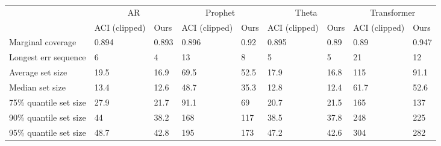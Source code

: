 \begin{tabular}{lllllllll}
\toprule
& \multicolumn{2}{c}{AR}& \multicolumn{2}{c}{Prophet}& \multicolumn{2}{c}{Theta}& \multicolumn{2}{c}{Transformer} \\
& ACI (clipped) & Ours & ACI (clipped) & Ours & ACI (clipped) & Ours & ACI (clipped) & Ours \\
\midrule
Marginal coverage & 0.894 & 0.893 & 0.896 & 0.92 & 0.895 & 0.89 & 0.89 & 0.947 \\
Longest err sequence & 6 & 4 & 13 & 8 & 5 & 5 & 21 & 12 \\
Average set size & 19.5 & 16.9 & 69.5 & 52.5 & 17.9 & 16.8 & 115 & 91.1 \\
Median set size & 13.4 & 12.6 & 48.7 & 35.3 & 12.8 & 12.4 & 61.7 & 52.6 \\
75\% quantile set size & 27.9 & 21.7 & 91.1 & 69 & 20.7 & 21.5 & 165 & 137 \\
90\% quantile set size & 44 & 38.2 & 168 & 117 & 38.5 & 37.8 & 248 & 225 \\
95\% quantile set size & 48.7 & 42.8 & 195 & 173 & 47.2 & 42.6 & 304 & 282 \\
\bottomrule
\end{tabular}
